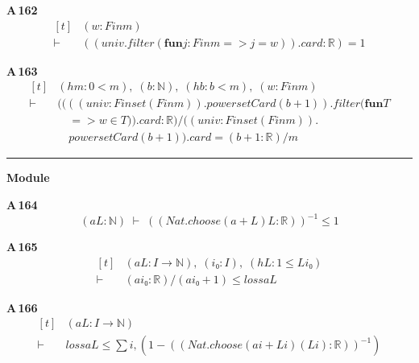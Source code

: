 \noindent\textbf{A\,162}\quad{}
{\footnotesize\[ \begin{aligned}[t]
&(\mathit{w} : \mathit{Fin} \mathit{m})\\
\vdash\;&((\mathit{univ}.\mathit{filter} (\mathbf{fun} \mathit{j} : \mathit{Fin} \mathit{m} => \mathit{j} = \mathit{w})).\mathit{card} : \mathbb{R} ) = 1
\end{aligned} \]}

\noindent\textbf{A\,163}\quad{}
{\footnotesize\[ \begin{aligned}[t]
&(\mathit{hm} : 0 < \mathit{m}),\; (\mathit{b} : \mathbb{N} ),\; (\mathit{hb} : \mathit{b} < \mathit{m}),\; (\mathit{w} : \mathit{Fin} \mathit{m})\\
\vdash\;&((((\mathit{univ} : \mathit{Finset} (\mathit{Fin} \mathit{m})).\mathit{powersetCard} (\mathit{b}+1)).\mathit{filter} (\mathbf{fun} \mathit{T}\\
&\quad => \mathit{w} \in \mathit{T})).\mathit{card} : \mathbb{R} ) / ((\mathit{univ} : \mathit{Finset} (\mathit{Fin} \mathit{m})).\\
&\quad \mathit{powersetCard} (\mathit{b}+1)).\mathit{card} = (\mathit{b}+1 : \mathbb{R} )/\mathit{m}
\end{aligned} \]}

\vspace{4pt}\noindent\rule{\columnwidth}{0.4pt}\par\vspace{2pt}
\noindent\textbf{Module }\par\vspace{3pt}

\noindent\textbf{A\,164}\quad{}
{\footnotesize\[ (\mathit{a} \mathit{L} : \mathbb{N} ) \;\vdash\; ((\mathit{Nat}.\mathit{choose} (\mathit{a} + \mathit{L}) \mathit{L} : \mathbb{R} ))^{-1} \leq 1 \]}

\noindent\textbf{A\,165}\quad{}
{\footnotesize\[ \begin{aligned}[t]
&(\mathit{a} \mathit{L} : \mathit{I} \to \mathbb{N} ),\; (\mathit{i₀} : \mathit{I}),\; (\mathit{hL} : 1 \leq \mathit{L} \mathit{i₀})\\
\vdash\;&(\mathit{a} \mathit{i₀} : \mathbb{R} ) / (\mathit{a} \mathit{i₀} + 1) \leq \mathit{loss} \mathit{a} \mathit{L}
\end{aligned} \]}

\noindent\textbf{A\,166}\quad{}
{\footnotesize\[ \begin{aligned}[t]
&(\mathit{a} \mathit{L} : \mathit{I} \to \mathbb{N} )\\
\vdash\;&\mathit{loss} \mathit{a} \mathit{L} \leq \textstyle\sum \mathit{i}, (1 - ((\mathit{Nat}.\mathit{choose} (\mathit{a} \mathit{i} + \mathit{L} \mathit{i}) (\mathit{L} \mathit{i}) : \mathbb{R} ))^{-1} )
\end{aligned} \]}

